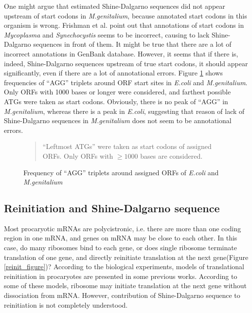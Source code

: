 One might argue that estimated Shine-Dalgarno sequences did not appear
upstream of start codons in {\it M.genitalium}, because annotated
start codons in this organism is wrong. Frishman et
al.\cite{label1005} point out that annotations of start codons in {\it
Mycoplasma} and {\it Synechocystis} seems to be incorrect, causing to
lack Shine-Dalgarno sequences in front of them. It might be true
that there are a lot of incorrect annotations in GenBank
database. However, it seems that if there is, indeed, Shine-Dalgarno
sequences upstream of true start codons, it should appear
significantly, even if there are a lot of annotational errors. Figure
\ref{ec_mgen_lorf_agg} shows frequencies of ``AGG'' triplets around
ORF start sites in {\it E.coli} and {\it M.genitalium}. Only ORFs with
1000 bases or longer were considered, and farthest possible ATGs were
taken as start codons. Obviously, there is no peak of ``AGG'' in {\it
M.genitalium}, whereas there is a peak in {\it E.coli}, suggesting that
reason of lack of Shine-Dalgarno sequences in {\it
M.genitalium} does not seem to be annotational errors.

\begin{figure}
\begin{center}
\end{center}
\caption{Frequency of ``AGG'' triplets around assigned ORFs of {\it E.coli} and {\it M.genitalium}}
\label{ec_mgen_lorf_agg}
\begin{small}
\begin{quotation}
``Leftmost ATGs'' were taken as start codons of assigned ORFs. Only ORFs with \(\geq 1000\) bases are considered. 
\end{quotation}
\end{small}
\end{figure}


\subsection{Reinitiation and Shine-Dalgarno sequence}

Most procaryotic mRNAs are polycistronic, i.e. there are more than one
coding region in one mRNA, and genes on mRNA may be close to each
other. In this case, do many ribosomes bind to each gene, or does
single ribosome terminate translation of one gene, and directly
reinitiate translation at the next gene(Figure \ref{reinit_figure})? 
According to the biological experiments, models of translational
reinitiation in procaryotes are presented in some previous
works\cite{label891}. According to some of these models, ribosome may
initiate translation at the next gene without dissociation from
mRNA. However, contribution of Shine-Dalgarno sequence to reinitiation
is not completely understood.

